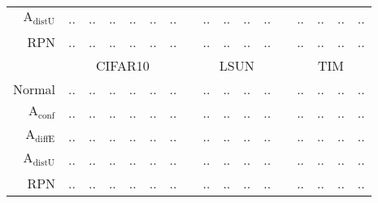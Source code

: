 \begin{table}[ht]
\begin{tiny}
\begin{tabular}{@{}rrrrrrrcrrrrcrrrr@{}}
			$\mathrm{A}_{\mathrm{distU}}$ & .. & .. & .. & .. & .. & .. & & .. & .. & .. & .. & & .. & .. & .. & .. \\
			RPN                           & .. & .. & .. & .. & .. & .. & & .. & .. & .. & .. & & .. & .. & .. & .. \\
			\midrule
			& \multicolumn{6}{c}{CIFAR10} & & \multicolumn{4}{c}{LSUN} & & \multicolumn{4}{c}{TIM} \\
			Normal                         & .. & .. & .. & .. & .. & .. & & .. & .. & .. & .. & & .. & .. & .. & .. \\
			$\mathrm{A}_{\mathrm{conf}}$  & .. & .. & .. & .. & .. & .. & & .. & .. & .. & .. & & .. & .. & .. & .. \\
			$\mathrm{A}_{\mathrm{diffE}}$ & .. & .. & .. & .. & .. & .. & & .. & .. & .. & .. & & .. & .. & .. & .. \\
			$\mathrm{A}_{\mathrm{distU}}$ & .. & .. & .. & .. & .. & .. & & .. & .. & .. & .. & & .. & .. & .. & .. \\
			RPN                           & .. & .. & .. & .. & .. & .. & & .. & .. & .. & .. & & .. & .. & .. & .. \\
			\bottomrule
		\end{tabular}
	\end{tiny}
	\label{tab:res_smoothing}
\end{table}








